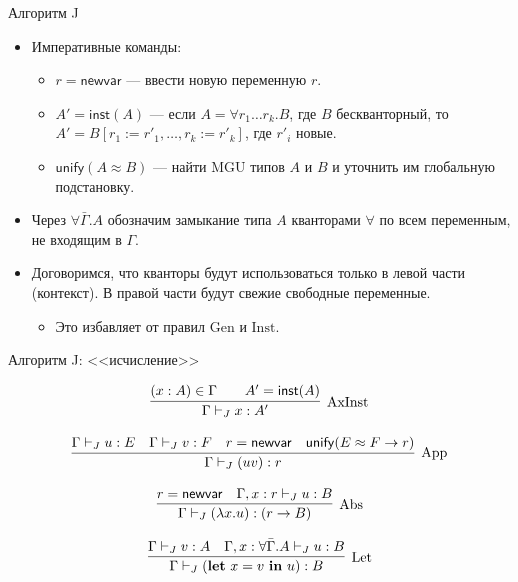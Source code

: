 \documentclass[xcolor=dvipsnames]{beamer}
\newcommand{\letin}[2]{\mathbf{let}\ {#1}\ \mathbf{in}\ {#2}}
\begin{document}
\begin{frame}{Алгоритм J}

\begin{itemize}[<+->]
 \item Императивные команды:
 \begin{itemize}
    \item $r = \mathsf{newvar}$ --- ввести новую переменную $r$.
    \item $A' = \mathsf{inst}(A)$ --- если $A = \forall r_1 \ldots r_k. B$, где $B$ бескванторный, то $A' = B[r_1 := r'_1, \ldots, r_k := r'_k]$, где $r'_i$ новые.
    \item $\mathsf{unify}(A \approx B)$ --- найти MGU типов $A$ и $B$ и уточнить им глобальную подстановку.
 \end{itemize}
 \item Через $\forall\bar{\Gamma}.A$ обозначим замыкание типа $A$ кванторами $\forall$ по всем переменным, не входящим в $\Gamma$.
 \item Договоримся, что кванторы будут использоваться только в левой части (контекст). В правой части будут свежие свободные переменные.
 \begin{itemize}
 \item Это избавляет от правил $\mathrm{Gen}$ и $\mathrm{Inst}$.
 \end{itemize}
\end{itemize}

 
\end{frame}

\begin{frame}{Алгоритм J: <<исчисление>>}

\[
 \infer[\mathrm{AxInst}]
 {\Gamma \vdash_J x : A'}
 {(x : A) \in \Gamma \qquad A' = \mathsf{inst}(A)}
\]

\[
 \infer[\mathrm{App}]
 {\Gamma \vdash_J (uv) : r}
 {\Gamma \vdash_J u : E &
 \Gamma \vdash_J v : F & 
 r = \mathsf{newvar} &
 \mathsf{unify}(E \approx F \to r)}
\]

\[
 \infer[\mathrm{Abs}]
 {\Gamma \vdash_J (\lambda x. u) : (r \to B)}
 {r = \mathsf{newvar} & 
 \Gamma, x : r \vdash_J u : B}
\]

\[
 \infer[\mathrm{Let}]
 {\Gamma \vdash_J (\letin{x = v}{u}) : B}
 {\Gamma \vdash_J v : A & 
 \Gamma, x : \forall\bar{\Gamma}. A \vdash_J u:B}
\]


 
\end{frame}
\end{document}
